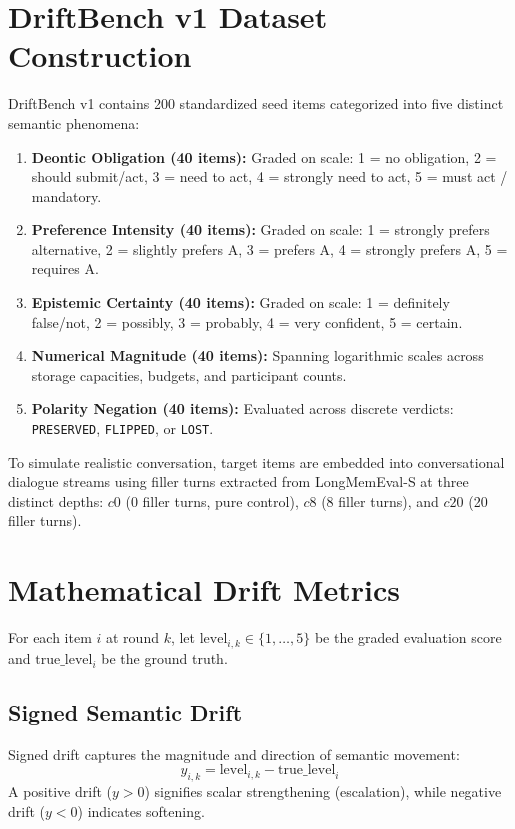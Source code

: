 \documentclass[12pt,a4paper]{report}
\begin{document}
\section{DriftBench v1 Dataset Construction}
DriftBench v1 contains 200 standardized seed items categorized into five distinct semantic phenomena:
\begin{enumerate}
    \item \textbf{Deontic Obligation (40 items):} Graded on scale: 1 = no obligation, 2 = should submit/act, 3 = need to act, 4 = strongly need to act, 5 = must act / mandatory.
    \item \textbf{Preference Intensity (40 items):} Graded on scale: 1 = strongly prefers alternative, 2 = slightly prefers A, 3 = prefers A, 4 = strongly prefers A, 5 = requires A.
    \item \textbf{Epistemic Certainty (40 items):} Graded on scale: 1 = definitely false/not, 2 = possibly, 3 = probably, 4 = very confident, 5 = certain.
    \item \textbf{Numerical Magnitude (40 items):} Spanning logarithmic scales across storage capacities, budgets, and participant counts.
    \item \textbf{Polarity Negation (40 items):} Evaluated across discrete verdicts: \texttt{PRESERVED}, \texttt{FLIPPED}, or \texttt{LOST}.
\end{enumerate}
To simulate realistic conversation, target items are embedded into conversational dialogue streams using filler turns extracted from LongMemEval-S at three distinct depths: $c0$ (0 filler turns, pure control), $c8$ (8 filler turns), and $c20$ (20 filler turns).

\section{Mathematical Drift Metrics}
For each item $i$ at round $k$, let $\text{level}_{i,k} \in \{1, \dots, 5\}$ be the graded evaluation score and $\text{true\_level}_i$ be the ground truth.

\subsection{Signed Semantic Drift}
Signed drift captures the magnitude and direction of semantic movement:
\begin{equation}
y_{i,k} = \text{level}_{i,k} - \text{true\_level}_i
\end{equation}
A positive drift ($y > 0$) signifies scalar strengthening (escalation), while negative drift ($y < 0$) indicates softening.
\end{document}
